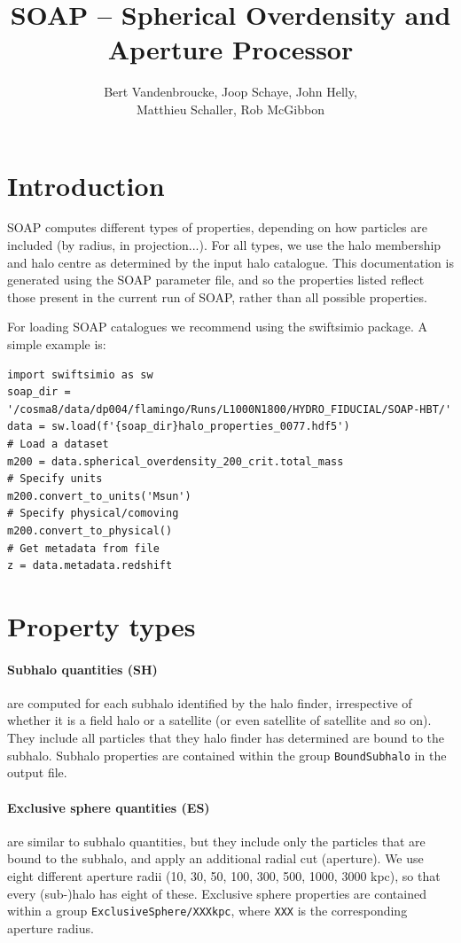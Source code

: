\documentclass{article}
\title{SOAP -- Spherical Overdensity and Aperture Processor}
\author{Bert Vandenbroucke, Joop Schaye, John Helly, \\Matthieu Schaller, Rob McGibbon}
\date{}
\begin{document}
\maketitle



\section{Introduction}

SOAP computes different types of properties, depending on  how particles are included (by radius, in projection...). 
For all types, we use the halo membership and halo centre as determined by the input halo catalogue. 
This documentation is generated using the SOAP parameter file, and so the properties listed reflect those
present in the current run of SOAP, rather than all possible properties.

For loading SOAP catalogues we recommend using the swiftsimio package. A simple example is:
\begin{verbatim}
import swiftsimio as sw
soap_dir = '/cosma8/data/dp004/flamingo/Runs/L1000N1800/HYDRO_FIDUCIAL/SOAP-HBT/'
data = sw.load(f'{soap_dir}halo_properties_0077.hdf5')
# Load a dataset
m200 = data.spherical_overdensity_200_crit.total_mass
# Specify units
m200.convert_to_units('Msun')
# Specify physical/comoving
m200.convert_to_physical()
# Get metadata from file
z = data.metadata.redshift
\end{verbatim}

\section{Property types}

\paragraph{Subhalo quantities (SH)} are computed for each subhalo identified by the halo finder, irrespective of whether 
it is a field halo or a satellite (or even satellite of satellite and so on). They include all particles 
that they halo finder has determined are bound to the subhalo. Subhalo properties are contained within the group 
\verb+BoundSubhalo+ in the output file.

\paragraph{Exclusive sphere quantities (ES)} are similar to subhalo quantities, but they include only the 
particles that are bound to the subhalo, and apply an additional radial cut (aperture). We use eight 
different aperture radii (10, 30, 50, 100, 300, 500, 1000, 3000 kpc), so that every (sub-)halo has eight of 
these. Exclusive sphere properties are contained within a group \verb+ExclusiveSphere/XXXkpc+, where 
\verb+XXX+ is the corresponding aperture radius.
\end{document}
